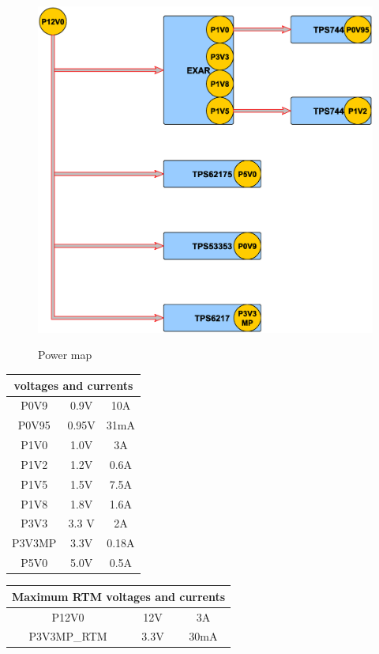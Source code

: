 	\begin{figure}[htbp!]
		\centering
		\includegraphics[scale=0.3]{img/pwr.eps}\\
		\caption{Power map} \label{powermap}
	\end{figure}
\clearpage	

\begin{longtable}{|c|c|c|} \hline
\multicolumn{3}{|c|}{voltages and currents}	\\ \hline
P0V9 & 0.9V & 10A \\ \hline
P0V95 & 0.95V & 31mA\\ \hline
P1V0 & 1.0V & 3A\\ \hline
P1V2 & 1.2V & 0.6A\\ \hline
P1V5 & 1.5V & 7.5A\\ \hline
P1V8 & 1.8V & 1.6A\\ \hline
P3V3 & 3.3 V & 2A\\ \hline
P3V3MP & 3.3V & 0.18A \\ \hline
P5V0 & 5.0V & 0.5A\\ \hline
\end{longtable}
	
\begin{longtable}{|c|c|c|} \hline
	\multicolumn{3}{|c|}{Maximum RTM voltages and currents}	\\ \hline
	P12V0 & 12V & 3A \\ \hline	
	P3V3MP\_RTM & 3.3V & 30mA \\ \hline
\end{longtable}
	
